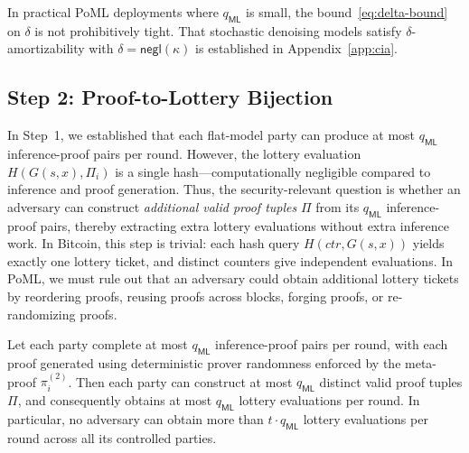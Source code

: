 In practical PoML deployments where $q_{\mathsf{ML}}$ is small, the bound~\eqref{eq:delta-bound} on $\delta$ is not prohibitively tight. That stochastic denoising models satisfy $\delta$-amortizability with $\delta = \mathsf{negl}(\kappa)$ is established in Appendix~\ref{app:cia}.


\subsection{Step 2: Proof-to-Lottery Bijection}

In Step~1, we established that each flat-model party can produce at most $q_{\mathsf{ML}}$ inference-proof pairs per round. However, the lottery evaluation $H(G(s,x), \Pi_i)$ is a single hash---computationally negligible compared to inference and proof generation. Thus, the security-relevant question is whether an adversary can construct \emph{additional valid proof tuples} $\Pi$ from its $q_{\mathsf{ML}}$ inference-proof pairs, thereby extracting extra lottery evaluations without extra inference work. In Bitcoin, this step is trivial: each hash query $H(\mathit{ctr}, G(s,x))$ yields exactly one lottery ticket, and distinct counters give independent evaluations. In PoML, we must rule out that an adversary could obtain additional lottery tickets by reordering proofs, reusing proofs across blocks, forging proofs, or re-randomizing proofs.

\begin{lemma}\label{lem:bijection}
Let each party complete at most $q_{\mathsf{ML}}$ inference-proof pairs per round, with each proof generated using deterministic prover randomness enforced by the meta-proof $\pi_i^{(2)}$. Then each party can construct at most $q_{\mathsf{ML}}$ distinct valid proof tuples $\Pi$, and consequently obtains at most $q_{\mathsf{ML}}$ lottery evaluations per round. In particular, no adversary can obtain more than $t \cdot q_{\mathsf{ML}}$ lottery evaluations per round across all its controlled parties.
\end{lemma}

